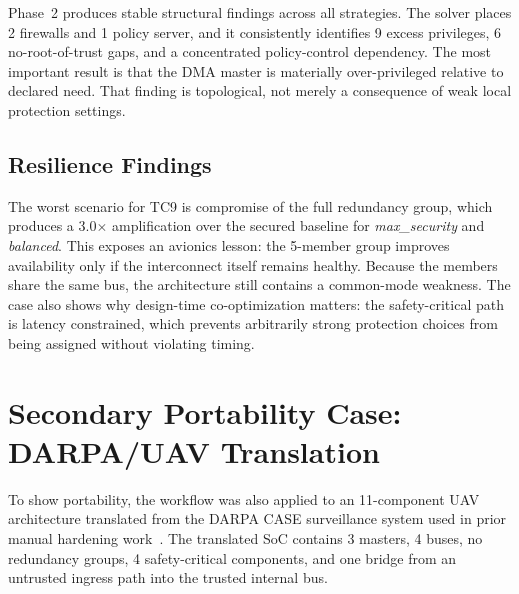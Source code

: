 \documentclass[conference]{IEEEtran}
\begin{document}
Phase~2 produces stable structural findings across all strategies. The solver
places 2 firewalls and 1 policy server, and it consistently identifies 9
excess privileges, 6 no-root-of-trust gaps, and a concentrated policy-control
dependency. The most important result is that the DMA master is materially
over-privileged relative to declared need. That finding is topological, not
merely a consequence of weak local protection settings.

\subsection{Resilience Findings}

The worst scenario for TC9 is compromise of the full redundancy group, which
produces a 3.0$\times$ amplification over the secured baseline for
\textit{max\_security} and \textit{balanced}. This exposes an avionics lesson:
the 5-member group improves availability only if the interconnect itself
remains healthy. Because the members share the same bus, the architecture
still contains a common-mode weakness. The case also shows why design-time
co-optimization matters: the safety-critical path is latency constrained,
which prevents arbitrarily strong protection choices from being assigned
without violating timing.

\section{Secondary Portability Case: DARPA/UAV Translation}

To show portability, the workflow was also applied to an 11-component UAV
architecture translated from the DARPA CASE surveillance system used in prior
manual hardening work~\cite{hasan_saecps,hasan_jsys,darpa_case}. The
translated SoC contains 3 masters, 4 buses, no redundancy groups, 4
safety-critical components, and one bridge from an untrusted ingress path
into the trusted internal bus.
\end{document}
